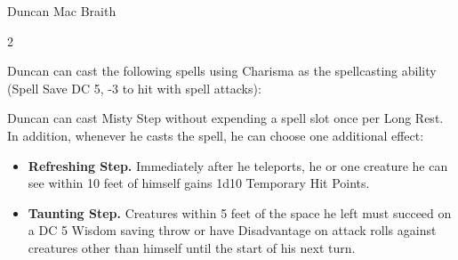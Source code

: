 \begin{DndMonster}[width=\textwidth + 8pt]{Duncan Mac Braith}
\begin{multicols}{2}
		\begin{DndMonsterSpells}
			\item[Spellcasting] Duncan can cast the following spells using Charisma as the spellcasting ability (Spell Save DC 5, -3 to hit with spell attacks):
		\end{DndMonsterSpells}
		
		Duncan can cast Misty Step without expending a spell slot once per Long Rest. In addition, whenever he casts the spell, he can choose one additional effect:
		\begin{itemize}
			\item \textbf{Refreshing Step.} Immediately after he teleports, he or one creature he can see within 10 feet of himself gains 1d10 Temporary Hit Points.
			\item \textbf{Taunting Step.} Creatures within 5 feet of the space he left must succeed on a DC 5 Wisdom saving throw or have Disadvantage on attack rolls against creatures other than himself until the start of his next turn.
		\end{itemize}
	\end{multicols}
\end{DndMonster}